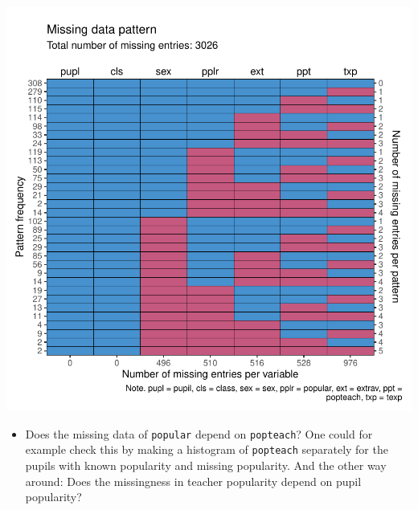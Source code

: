 \documentclass[
]{jss}
\providecommand{\tightlist}{%
  \setlength{\itemsep}{0pt}\setlength{\parskip}{0pt}}
\begin{document}
\begin{CodeChunk}


\begin{center}\includegraphics{Manuscript_files/figure-latex/pop_pat-1} \end{center}

\end{CodeChunk}

\begin{itemize}
\tightlist
\item
  Does the missing data of \texttt{popular} depend on \texttt{popteach}?
  One could for example check this by making a histogram of
  \texttt{popteach} separately for the pupils with known popularity and
  missing popularity. And the other way around: Does the missingness in
  teacher popularity depend on pupil popularity?
\end{itemize}
\end{document}
